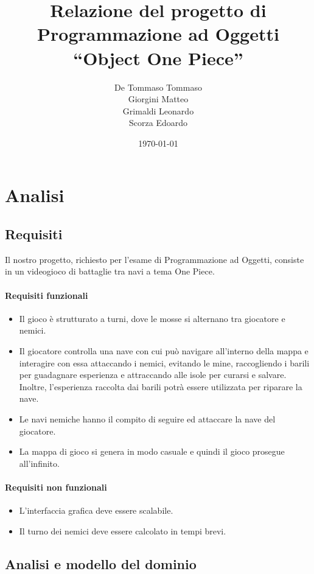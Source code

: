 \documentclass[a4paper,12pt]{report}
\title{Relazione del progetto di\\Programmazione ad Oggetti\\``Object One Piece''}
\author{De Tommaso Tommaso\\Giorgini Matteo\\Grimaldi Leonardo\\Scorza Edoardo}
\date{\today}
\begin{document}
\maketitle

\tableofcontents

\chapter{Analisi}	

\section{Requisiti}

Il nostro progetto, richiesto per l'esame di Programmazione ad Oggetti, consiste in un videogioco di battaglie tra navi a tema One Piece.

\subsubsection{Requisiti funzionali}
\begin{itemize}
	\item Il gioco è strutturato a turni, dove le mosse si alternano tra giocatore e nemici.
	\item Il giocatore controlla una nave con cui può navigare all'interno della mappa e interagire con essa
	attaccando i nemici, evitando le mine, raccogliendo i barili per guadagnare esperienza e attraccando alle isole per curarsi e salvare.
	Inoltre, l'esperienza raccolta dai barili potrà essere utilizzata per riparare la nave.
	\item Le navi nemiche hanno il compito di seguire ed attaccare la nave del giocatore.
	\item La mappa di gioco si genera in modo casuale e quindi il gioco prosegue all'infinito.
\end{itemize}

\subsubsection{Requisiti non funzionali}
\begin{itemize}
	\item L'interfaccia grafica deve essere scalabile.
	\item Il turno dei nemici deve essere calcolato in tempi brevi.
\end{itemize}

\section{Analisi e modello del dominio}
\end{document}
